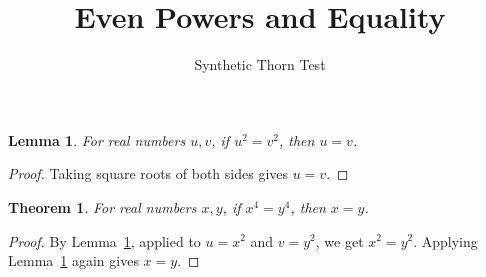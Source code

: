 \documentclass{article}
\newtheorem{lemma}{Lemma}
\newtheorem{theorem}{Theorem}
\begin{document}
\title{Even Powers and Equality}
\author{Synthetic Thorn Test}
\maketitle

\begin{lemma}\label{lem:bad-square-root}
For real numbers $u,v$, if $u^2=v^2$, then $u=v$.
\end{lemma}
\begin{proof}
Taking square roots of both sides gives $u=v$.
\end{proof}

\begin{theorem}\label{thm:depends-bad-lemma}
For real numbers $x,y$, if $x^4=y^4$, then $x=y$.
\end{theorem}
\begin{proof}
By Lemma~\ref{lem:bad-square-root}, applied to $u=x^2$ and $v=y^2$, we get $x^2=y^2$. Applying Lemma~\ref{lem:bad-square-root} again gives $x=y$.
\end{proof}
\end{document}
